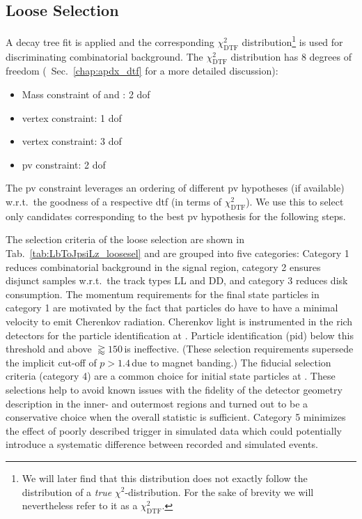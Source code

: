 \subsection{Loose Selection}
\label{sec:LbToJpsiLz_loosesel}
A decay tree fit is applied and the corresponding $\chi^2_\text{DTF}$ distribution\footnote{We will later find that this distribution does not exactly follow the distribution of a \textit{true} $\chi^2$-distribution. For the sake of brevity we will nevertheless refer to it as a $\chi^2_\text{DTF}$.} is used for discriminating combinatorial background.
The $\chi^2_\text{DTF}$ distribution has 8 degrees of freedom (\cf{}~Sec.~\ref{chap:apdx_dtf} for a more detailed discussion):
\begin{itemize}[itemsep=2pt,parsep=2pt]
    \item Mass constraint of \Lz and \jpsi: 2 \gls{dof}
    \item \Lz vertex constraint: 1 \gls{dof}
    \item \decay{\Lb}{\mup\mun\Lz} vertex constraint: 3 \gls{dof}
    \item \Lb \gls{pv} constraint: 2 \gls{dof}
\end{itemize}
The \gls{pv} constraint leverages an ordering of different \gls{pv} hypotheses (if available) w.r.t.\ the goodness of a respective \gls{dtf} (in terms of $\chi^2_\text{DTF}$).
We use this to select only candidates corresponding to the best \gls{pv} hypothesis for the following steps.

The selection criteria of the loose selection are shown in Tab.~\ref{tab:LbToJpsiLz_loosesel} and are grouped into five categories:
Category 1 reduces combinatorial background in the signal region, category 2 ensures disjunct samples w.r.t.\ the track types \gls{LL} and \gls{DD}, and category 3 reduces disk consumption.
The momentum requirements for the final state particles in category 1 are motivated by the fact that particles do have to have a minimal velocity to emit Cherenkov radiation.
Cherenkov light is instrumented in the \gls{rich} detectors for the particle identification at \lhcb.
Particle identification (\gls{pid}) below this threshold and above $\gtrapprox 150\,$\gevc is ineffective.
(These selection requirements supersede the implicit cut-off of $p > 1.4\,$\gevc due to magnet banding.)
The fiducial selection criteria (category 4) are a common choice for initial state particles at \lhcb.
These selections help to avoid known issues with the fidelity of the detector geometry description in the inner- and outermost regions and turned out to be a conservative choice when the overall statistic is sufficient.
Category 5 minimizes the effect of poorly described trigger in simulated data which could potentially introduce a systematic difference between recorded and simulated events.

